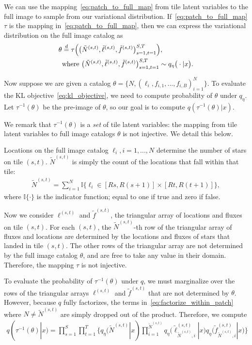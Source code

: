
\noindent We can use the mapping~\eqref{eq:patch_to_full_map}
from tile latent variables to the full image 
to sample from our variational distribution.
If~\eqref{eq:patch_to_full_map} 
$\tau$ is the mapping in~\eqref{eq:patch_to_full_map}, then 
we can express the variational distribution
on the full image catalog as 
\begin{align}
    \theta &\stackrel{d}{=} \tau\Big( \big(\tilde N^{(s, t)}, \tilde \ell^{(s, t)}, \tilde f^{(s, t)}\big)_{s=1, t = 1}^{S,T}\Big), \notag \\  
        &\text{where } 
        \big(\tilde N^{(s, t)}, \tilde \ell^{(s, t)}, \tilde f^{(s, t)}\big)_{s=1, t = 1}^{S,T}
        \sim 
        q_\eta\big( \cdot |x\big).
\end{align}

Now suppose we are given a catalog 
$\theta = \{N, (\ell_i, f_{i,1}, ..., f_{i,B})_{i = 1}^N\}$. To evaluate
the KL objective~\eqref{eq:kl_objective}, 
we need to compute probability of $\theta$ under $q_\eta$. Let $\tau^{-1}(\theta)$ be
the pre-image of $\theta$, so our 
goal is to compute $q(\tau^{-1}(\theta) | x)$. 

We remark that $\tau^{-1}(\theta)$ is a {\itshape set} of tile latent variables: the mapping from tile latent variables to full image catalogs $\theta$ is not injective. We detail this below. 

Locations on the full image catalog $\ell_i, i = 1, ..., N$ determine the number of stars on tile $(s,t)$. $\tilde N^{(s,t)}$ is simply the count of the locations that fall within that tile:
\begin{align}
\tilde N^{(s,t)} = \sum_{i=1}^N 
\mathbb{I}\Big\{\ell_i\in [Rs, R(s+1)] \times [Rt, R(t+1)]\Big\},
\end{align}
where $\mathbb{I}\{\cdot\}$ is the indicator function; equal to one if true and zero if false.

Now we consider $\ell^{(s, t)}$ and $\tilde f^{(s, t)}$, the triangular array of locations and fluxes on tile $(s,t)$. 
For each $(s,t)$, the $\tilde N^{(s,t)}$-th row 
of the triangular array of fluxes and locations are 
determined by the locations and fluxes of stars that landed in tile $(s,t)$. The other rows 
of the triangular array are not determined by 
the full image catalog $\theta$, and are free to take any value in their domain. Therefore, the mapping $\tau$ is not injective. 

To evaluate the probability of $\tau^{-1}(\theta)$ under $q$, we must marginalize over the rows of the triangular arrays $\ell^{(s, t)}$ and $\tilde f^{(s, t)}$ that are not determined by $\theta$. However, 
because $q$ fully factorizes, the terms 
in~\ref{eq:factorize_within_patch} where $N \not= \tilde N^{(s,t)}$ are simply dropped out of the product. Therefore, we compute 
\begin{align}
    q(\tau^{-1}(\theta) | x) = \prod_{s=1}^S\prod_{t=1}^T
    \Big\{
    q_\eta(\tilde N^{(s,t)} | x) 
    \prod_{i = 1}^{\tilde N^{(s,t)}}
    q_\eta\big(\tilde \ell_{\tilde N^{(s,t)},i}^{(s, t)} | x\big)
    q_\eta\big(\tilde f_{\tilde N^{(s,t)},i}^{(s, t)} | x\big)
    \Big\}
\end{align}

